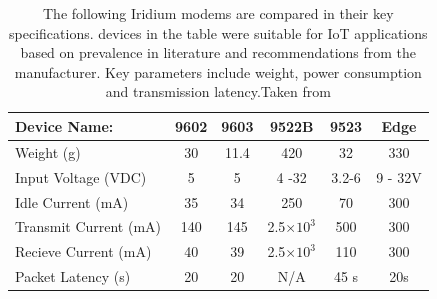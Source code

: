 \begin{table}[H]
    \centering
        \caption{ The following Iridium modems are compared in their key specifications. devices in the table were suitable for IoT applications based on prevalence in literature and recommendations from the manufacturer. Key parameters include weight, power consumption and transmission latency.Taken from \cite{iridium_product} }
    \label{tab:ir_devices}
    \begin{tabular}{|l|c|c|c|c|c|}
    \hline
         \textbf{Device Name: } & \textbf{9602} & \textbf{9603} & \textbf{9522B\footnotemark} & \textbf{9523} & \textbf{Edge}\\
         \hline
         Weight (g) & 30 & 11.4 & 420 & 32 & 330 \\
         \hline
         Input Voltage (VDC) & 5 &5 & 4 -32 & 3.2-6 & 9 - 32V\\
         \hline
         Idle Current (mA) & 35 & 34 & 250 & 70 &300\\
         \hline
         Transmit Current (mA)& 140 & 145 &2.5$\times10^3$&500& 300 \\
         \hline
         Recieve Current (mA) & 40 & 39 &2.5$\times10^3$&110 & 300 \\
         \hline
         Packet Latency (s) &  20  &  20 & N/A &45 s& 20s\\
         \hline
    \end{tabular}
\end{table}

